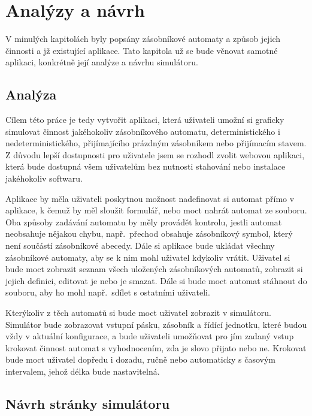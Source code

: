 \chapter{Analýzy a návrh}\label{chap:AppSpecifications}

V minulých kapitolách byly popsány zásobníkové automaty a způsob jejich činnosti a jž existující aplikace. Tato kapitola už se bude věnovat samotné aplikaci, konkrétně její analýze a návrhu simulátoru.

\section{Analýza}

Cílem této práce je tedy vytvořit aplikaci, která uživateli umožní si graficky simulovat činnost jakéhokoliv zásobníkového automatu, deterministického i nedeterministického, přijímajícího prázdným zásobníkem nebo přijímacím stavem. Z důvodu lepší dostupnosti pro uživatele jsem se rozhodl zvolit webovou aplikaci, která bude dostupná všem uživatelům bez nutnosti stahování nebo instalace jakéhokoliv softwaru. 

Aplikace by měla uživateli poskytnou možnost nadefinovat si automat přímo v aplikace, k čemuž by měl sloužit formulář, nebo moct nahrát automat ze souboru. Oba způsoby zadávání automatu by měly provádět kontrolu, jestli automat neobsahuje nějakou chybu, např.~přechod obsahuje zásobníkový symbol, který není součástí zásobníkové abecedy. Dále si aplikace bude ukládat všechny zásobníkové automaty, aby se k nim mohl uživatel kdykoliv vrátit. Uživatel si bude moct zobrazit seznam všech uložených zásobníkových automatů, zobrazit si jejich definici, editovat je nebo je smazat. Dále si bude moct automat stáhnout do souboru, aby ho mohl např.~sdílet s ostatními uživateli. 

Kterýkoliv z těch automatů si bude moct uživatel zobrazit v simulátoru. Simulátor bude zobrazovat vstupní pásku, zásobník a řídící jednotku, které budou vždy v aktuální konfigurace, a bude uživateli umožňovat pro jím zadaný vstup krokovat činnost automat s vyhodnocením, zda je slovo přijato nebo ne. Krokovat bude moct uživatel dopředu i dozadu, ručně nebo automaticky s časovým intervalem, jehož délka bude nastavitelná.

\section{Návrh stránky simulátoru}


